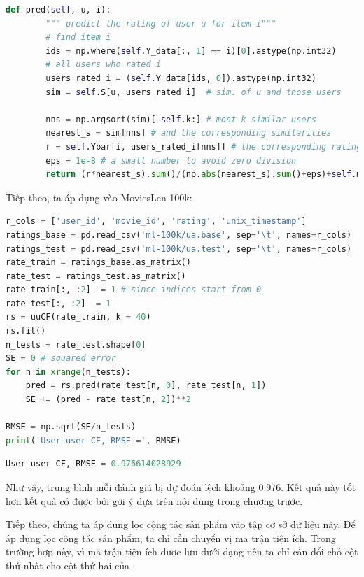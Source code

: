 \begin{lstlisting}[language=Python]
    def pred(self, u, i):
        """ predict the rating of user u for item i"""
        # find item i
        ids = np.where(self.Y_data[:, 1] == i)[0].astype(np.int32)
        # all users who rated i
        users_rated_i = (self.Y_data[ids, 0]).astype(np.int32)
        sim = self.S[u, users_rated_i]  # sim. of u and those users

        nns = np.argsort(sim)[-self.k:] # most k similar users
        nearest_s = sim[nns] # and the corresponding similarities
        r = self.Ybar[i, users_rated_i[nns]] # the corresponding ratings
        eps = 1e-8 # a small number to avoid zero division
        return (r*nearest_s).sum()/(np.abs(nearest_s).sum()+eps)+self.mu[u]

\end{lstlisting}

Tiếp theo, ta áp dụng vào MoviesLen 100k:
\begin{lstlisting}[language=Python]
r_cols = ['user_id', 'movie_id', 'rating', 'unix_timestamp']
ratings_base = pd.read_csv('ml-100k/ua.base', sep='\t', names=r_cols)
ratings_test = pd.read_csv('ml-100k/ua.test', sep='\t', names=r_cols)
rate_train = ratings_base.as_matrix()
rate_test = ratings_test.as_matrix()
rate_train[:, :2] -= 1 # since indices start from 0
rate_test[:, :2] -= 1
rs = uuCF(rate_train, k = 40)
rs.fit()
n_tests = rate_test.shape[0]
SE = 0 # squared error
for n in xrange(n_tests):
    pred = rs.pred(rate_test[n, 0], rate_test[n, 1])
    SE += (pred - rate_test[n, 2])**2

RMSE = np.sqrt(SE/n_tests)
print('User-user CF, RMSE =', RMSE)
\end{lstlisting}
\kq
\begin{lstlisting}[language=Python]
User-user CF, RMSE = 0.976614028929
\end{lstlisting}

Như vậy, trung bình mỗi đánh giá bị dự đoán lệch khoảng 0.976. Kết quả này tốt hơn kết quả có được bởi gợi ý dựa trên nội dung trong chương trước.

Tiếp theo, chúng ta áp dụng lọc cộng tác sản phẩm vào tập cơ sở dữ
liệu này. Để áp dụng lọc cộng tác sản phẩm, ta chỉ cần chuyển vị ma trận tiện ích. Trong trường hợp này, vì ma trận tiện ích được lưu dưới dạng
 nên ta chỉ cần đổi chỗ cột thứ nhất
cho cột thứ hai của :


